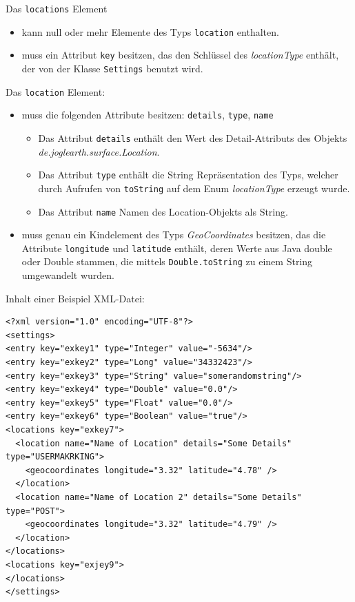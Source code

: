 \documentclass[10pt]{scrreprt}
\begin{document}
 Das \texttt{locations} Element
\begin{itemize}
 \item kann null oder mehr Elemente des Typs \texttt{location} enthalten.
 \item muss ein Attribut \texttt{key} besitzen, das den Schlüssel des \textit{locationType} enthält, der von der Klasse \texttt{Settings} benutzt wird.
\end{itemize}

 Das \texttt{location} Element:
\begin{itemize}
 \item muss die folgenden Attribute besitzen: \texttt{details}, \texttt{type}, \texttt{name}
 \begin{itemize}
  \item Das Attribut \texttt{details} enthält den Wert des Detail-Attributs des Objekts \textit{de.joglearth.surface.Location}.
  \item Das Attribut \texttt{type} enthält die String Repräsentation des Typs, welcher durch Aufrufen von \texttt{toString} auf dem Enum \textit{locationType} erzeugt wurde.
  \item Das Attribut \texttt{name} Namen des Location-Objekts als String.
  \end{itemize}
 \item muss genau ein Kindelement des Typs \textit{GeoCoordinates} besitzen, das die Attribute \texttt{longitude} und \texttt{latitude} enthält, deren Werte aus Java double oder Double stammen, die mittels \texttt{Double.toString} zu einem String umgewandelt wurden.
\end{itemize}
\newpage
Inhalt einer Beispiel XML-Datei:
\lstset{language=XML}
\begin{lstlisting}[frame=single]
<?xml version="1.0" encoding="UTF-8"?>
<settings>
<entry key="exkey1" type="Integer" value="-5634"/>
<entry key="exkey2" type="Long" value="34332423"/>
<entry key="exkey3" type="String" value="somerandomstring"/>
<entry key="exkey4" type="Double" value="0.0"/>
<entry key="exkey5" type="Float" value="0.0"/>
<entry key="exkey6" type="Boolean" value="true"/>
<locations key="exkey7">
  <location name="Name of Location" details="Some Details" type="USERMAKRKING">
    <geocoordinates longitude="3.32" latitude="4.78" />
  </location>
  <location name="Name of Location 2" details="Some Details" type="POST">
    <geocoordinates longitude="3.32" latitude="4.79" />
  </location>
</locations>
<locations key="exjey9">
</locations>
</settings>
\end{lstlisting}
\end{document}

